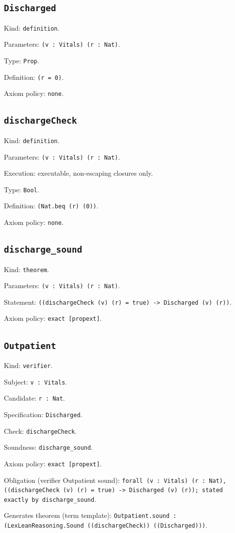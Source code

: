 \documentclass[11pt]{article}
\begin{document}
\subsection*{\texttt{Discharged}}
\noindent Kind: \texttt{definition}.\par
\noindent Parameters: \texttt{(v : Vitals) (r : Nat)}.\par
\noindent Type: \texttt{Prop}.\par
\noindent Definition: \texttt{(r = 0)}.\par
\noindent Axiom policy: \texttt{none}.\par
\subsection*{\texttt{dischargeCheck}}
\noindent Kind: \texttt{definition}.\par
\noindent Parameters: \texttt{(v : Vitals) (r : Nat)}.\par
\noindent Execution: executable, non-escaping closures only.\par
\noindent Type: \texttt{Bool}.\par
\noindent Definition: \texttt{(Nat.beq (r) (0))}.\par
\noindent Axiom policy: \texttt{none}.\par
\subsection*{\texttt{discharge\_sound}}
\noindent Kind: \texttt{theorem}.\par
\noindent Parameters: \texttt{(v : Vitals) (r : Nat)}.\par
\noindent Statement: \texttt{((dischargeCheck (v) (r) = true) -> Discharged (v) (r))}.\par
\noindent Axiom policy: \texttt{exact [propext]}.\par
\subsection*{\texttt{Outpatient}}
\noindent Kind: \texttt{verifier}.\par
\noindent Subject: \texttt{v : Vitals}.\par
\noindent Candidate: \texttt{r : Nat}.\par
\noindent Specification: \texttt{Discharged}.\par
\noindent Check: \texttt{dischargeCheck}.\par
\noindent Soundness: \texttt{discharge\_sound}.\par
\noindent Axiom policy: \texttt{exact [propext]}.\par
\noindent Obligation (verifier Outpatient sound): \texttt{forall (v : Vitals) (r : Nat), ((dischargeCheck (v) (r) = true) -> Discharged (v) (r)); stated exactly by discharge\_sound}.\par
\noindent Generates theorem (term template): \texttt{Outpatient.sound : (LexLeanReasoning.Sound ((dischargeCheck)) ((Discharged)))}.\par
\end{document}

